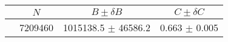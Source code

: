 \begin{tabular}{lccc}
\hline
    &   $N$   & $B \pm \delta B$  &  $C \pm \delta C$ \\
\hline
                               & 7209460    & 1015138.5  $\pm$ 46586.2 & 0.663      $\pm$ 0.005 \\
\hline
\end{tabular}
